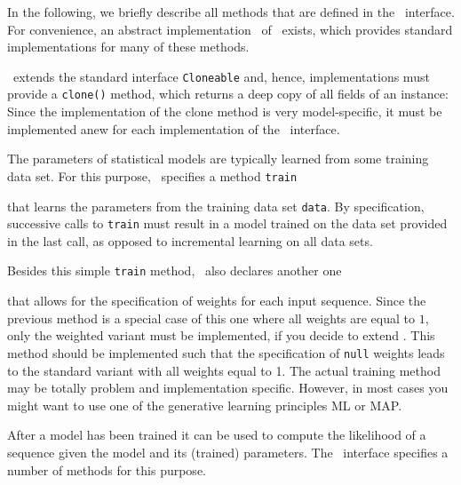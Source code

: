 In the following, we briefly describe all methods that are defined in the \TrainSM~interface. For convenience, an abstract implementation \AbstractTrainSM~of \TrainSM~exists, which provides standard implementations for many of these methods.

\renewcommand{\codefile}{../../de/jstacs/sequenceScores/SequenceScore.java}
\setcounter{off}{45}


\TrainSM~extends the standard interface \lstinline+Cloneable+ and, hence, implementations must provide a \lstinline+clone()+ method, which returns a deep copy of all fields of an instance:
Since the implementation of the clone method is very model-specific, it must be implemented anew for each implementation of the \TrainSM~interface.

The parameters of statistical models are typically learned from some training data set. For this purpose, \TrainSM~specifies a method \lstinline+train+
\addtocounter{off}{18}
that learns the parameters from the training data set \lstinline+data+. By specification, successive calls to \lstinline+train+ must result in a model trained on the data set provided in the last call, as opposed to incremental learning on all data sets.

Besides this simple \lstinline+train+ method, \TrainSM~also declares another one
\addtocounter{off}{27}
that allows for the specification of weights for each input sequence. Since the previous method is a special case of this one where all weights are equal to $1$, only the weighted variant must be implemented, if you decide to extend \AbstractTrainSM. This method should be implemented such that the specification of \lstinline+null+ weights leads to the standard variant with all weights equal to 1. The actual training method may be totally problem and implementation specific. However, in most cases you might want to use one of the generative learning principles ML or MAP.

After a model has been trained it can be used to compute the likelihood of a sequence given the model and its (trained) parameters. The \TrainSM~interface specifies a number of methods for this purpose.

